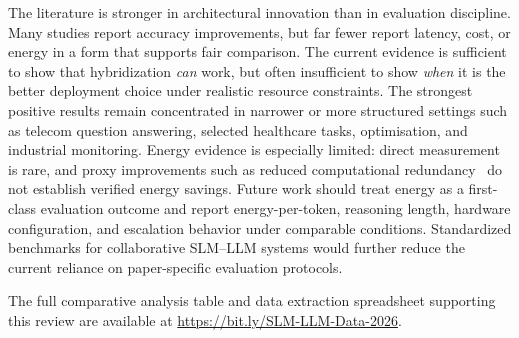 The literature is stronger in architectural innovation than in evaluation discipline. Many studies report accuracy improvements, but far fewer report latency, cost, or energy in a form that supports fair comparison. The current evidence is sufficient to show that hybridization \textit{can} work, but often insufficient to show \textit{when} it is the better deployment choice under realistic resource constraints. The strongest positive results remain concentrated in narrower or more structured settings such as telecom question answering, selected healthcare tasks, optimisation, and industrial monitoring. Energy evidence is especially limited: direct measurement is rare, and proxy improvements such as reduced computational redundancy~\cite{resiliomate2025} do not establish verified energy savings. Future work should treat energy as a first-class evaluation outcome and report energy-per-token, reasoning length, hardware configuration, and escalation behavior under comparable conditions. Standardized benchmarks for collaborative SLM--LLM systems would further reduce the current reliance on paper-specific evaluation protocols.

The full comparative analysis table and data extraction spreadsheet supporting this review are available at \url{https://bit.ly/SLM-LLM-Data-2026}.

